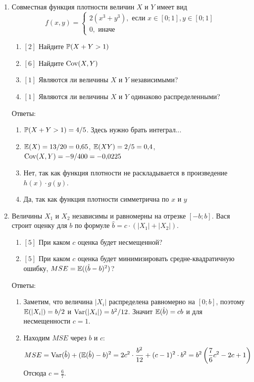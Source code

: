 \documentclass[12pt, a4paper]{article}\usepackage[]{graphicx}\usepackage[]{color}
\begin{document}
\begin{enumerate}

\item Совместная функция плотности величин $X$ и $Y$ имеет вид
\begin{equation}
f(x,y)=\begin{cases}
2(x^3+y^3), \mbox{ если } x\in [0;1], y\in [0;1] \\
0, \mbox{ иначе}
\end{cases}
\end{equation}
\begin{enumerate}
\item $[2]$ Найдите $\P(X+Y>1)$
\item $[6]$ Найдите $\Cov(X,Y)$
\item $[1]$ Являются ли величины $X$ и $Y$ независимыми?
\item $[1]$ Являются ли величины $X$ и $Y$ одинаково распределенными?
\end{enumerate}

Ответы:
\begin{enumerate}
\item $\P(X+Y>1)=4/5$. Здесь нужно брать интеграл...
\item $\E(X)=13/20=0{,}65$, $\E(XY)=2/5=0{,}4$, $\Cov(X,Y)=-9/400=-0{,}0225$
\item Нет, так как функция плотности не раскладывается в произведение $h(x)\cdot g(y)$.
\item Да, так как функция плотности симметрична по $x$ и $y$
\end{enumerate}


\item Величины $X_1$ и $X_2$ независимы и равномерны на отрезке $[-b;b]$. Вася строит оценку для $b$ по формуле $\hat{b}=c\cdot (|X_{1}|+|X_{2}|)$.
\begin{enumerate}
\item $[5]$ При каком $c$ оценка будет несмещенной?
\item $[5]$ При каком $c$ оценка будет минимизировать средне-квадратичную ошибку, $MSE=\E((\hat{b}-b)^{2})$?
\end{enumerate}

Ответы:
\begin{enumerate}
\item Заметим, что величина $|X_i|$ распределена равномерно на $[0;b]$, поэтому $\E(|X_i|)=b/2$ и $\Var(|X_i|)=b^2/12$. Значит $\E(\hat{b})=cb$ и для несмещенности $c=1$.
\item Находим $MSE$ через $b$ и $c$:
\begin{equation}
MSE=\Var(\hat{b})+(\E(\hat{b})-b)^2=2c^2\cdot \frac{b^2}{12}+(c-1)^2\cdot b^2=b^2\left(\frac{7}{6}c^2-2c+1\right)
\end{equation}
Отсюда $c=\frac{6}{7}$.
\end{enumerate}



\end{enumerate}
\end{document}
